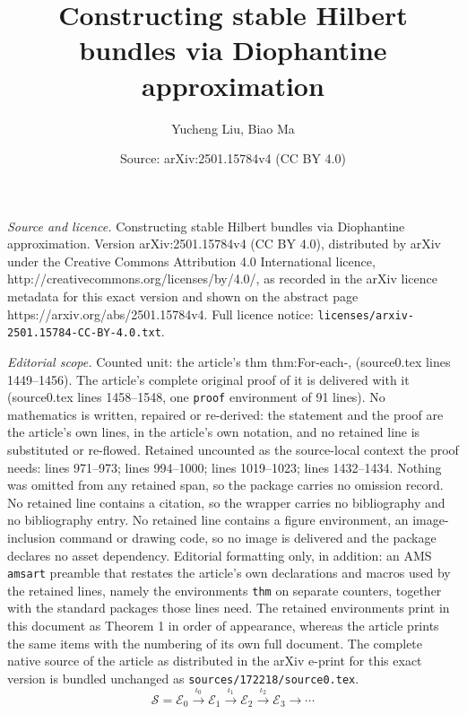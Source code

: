 \documentclass[10pt,a4paper]{amsart}
\title{Constructing stable Hilbert bundles via Diophantine approximation}
\author{Yucheng Liu, Biao Ma}
\date{Source: arXiv:2501.15784v4 (CC BY 4.0)}
\begin{document}
\maketitle

\noindent\emph{Source and licence.} Constructing stable Hilbert bundles via Diophantine approximation. Version arXiv:2501.15784v4 (CC BY 4.0), distributed by arXiv under the Creative Commons Attribution 4.0 International licence, http://creativecommons.org/licenses/by/4.0/, as recorded in the arXiv licence metadata for this exact version and shown on the abstract page https://arxiv.org/abs/2501.15784v4. Full licence notice: \texttt{licenses/arxiv-2501.15784-CC-BY-4.0.txt}.\par\smallskip

\noindent\textit{Editorial scope.} Counted unit: the article's thm thm:For-each-, (source0.tex lines 1449--1456). The article's complete original proof of it is delivered with it (source0.tex lines 1458--1548, one \texttt{proof} environment of 91 lines). No mathematics is written, repaired or re-derived: the statement and the proof are the article's own lines, in the article's own notation, and no retained line is substituted or re-flowed.  Retained uncounted as the source-local context the proof needs: lines 971--973; lines 994--1000; lines 1019--1023; lines 1432--1434.  Nothing was omitted from any retained span, so the package carries no omission record.  No retained line contains a citation, so the wrapper carries no bibliography and no bibliography entry.  No retained line contains a figure environment, an image-inclusion command or drawing code, so no image is delivered and the package declares no asset dependency.  Editorial formatting only, in addition: an AMS \texttt{amsart} preamble that restates the article's own declarations and macros used by the retained lines, namely the environments \texttt{thm} on separate counters, together with the standard packages those lines need.  The retained environments print in this document as Theorem 1 in order of appearance, whereas the article prints the same items with the numbering of its own full document.  The complete native source of the article as distributed in the arXiv e-print for this exact version is bundled unchanged as \texttt{sources/172218/source0.tex}.
\begin{equation}
\mathcal{S}=\mathcal{E}_{0}\overset{\iota_{0}}{\to}\mathcal{E}_{1}\overset{\iota_{1}}{\to}\mathcal{E}_{2}\overset{\iota_{2}}{\to}\mathcal{E}_{3}\to\cdots\label{eq:-28}
\end{equation}
\end{document}
